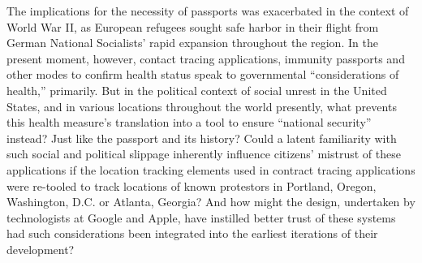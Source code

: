\documentclass[11pt,dvipdfm]{article}
\begin{document}
The implications for the necessity of passports was exacerbated in the context of World War II, as European refugees sought safe harbor in their flight from German National Socialists’ rapid expansion throughout the region.  In the present moment, however, contact tracing applications, immunity passports and other modes to confirm health status speak to governmental ``considerations of health,'' primarily.  But in the political context of social unrest in the United States, and in various locations throughout the world presently, what prevents this health measure’s translation into a tool to ensure ``national security'' instead?  Just like the passport and its history?  Could a latent familiarity with such social and political slippage inherently influence citizens’ mistrust of these applications if the location tracking elements used in contract tracing applications were re-tooled to track locations of known protestors in Portland, Oregon, Washington, D.C. or Atlanta, Georgia?  And how might the design, undertaken by technologists at Google and Apple, have instilled better trust of these systems had such considerations been integrated into the earliest iterations of their development?
\end{document}
